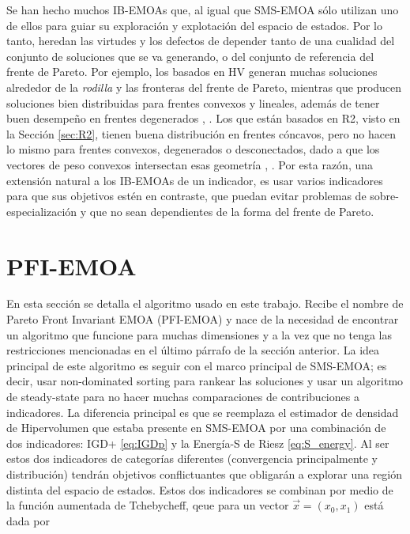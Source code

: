 Se han hecho muchos IB-EMOAs que, al igual que SMS-EMOA sólo utilizan uno de ellos para guiar su exploración y explotación del espacio de estados. Por lo tanto, heredan las virtudes y los defectos de depender tanto de una cualidad del conjunto de soluciones que se va generando, o del conjunto de referencia del frente de Pareto. Por ejemplo, los basados en HV generan muchas soluciones alrededor de la \emph{rodilla} y las fronteras del frente de Pareto, mientras que producen soluciones bien distribuidas para frentes convexos y lineales, además de tener buen desempeño en frentes degenerados \cite{HV_reference}, \cite{SMS-EMOA}. Los que están basados en R2, visto en la Sección \ref{sec:R2}, tienen buena distribución en frentes cóncavos, pero no hacen lo mismo para frentes convexos, degenerados o desconectados, dado a que los vectores de peso convexos intersectan esas geometría \cite{performance_pareto_front}, \cite{R2-EMOA}. Por esta razón, una extensión natural a los IB-EMOAs de un indicador, es usar varios indicadores para que sus objetivos estén en contraste, que puedan evitar problemas de sobre-especialización y que no sean dependientes de la forma del frente de Pareto.  

\section{PFI-EMOA} \label{sec:PFI-EMOA}

En esta sección se detalla el algoritmo usado en este trabajo. Recibe el nombre de Pareto Front Invariant EMOA (PFI-EMOA) y nace de la necesidad de encontrar un algoritmo que funcione para muchas dimensiones y a la vez que no tenga las restricciones mencionadas en el último párrafo de la sección anterior. La idea principal de este algoritmo es seguir con el marco principal de SMS-EMOA; es decir, usar non-dominated sorting para rankear las soluciones y usar un algoritmo de steady-state para no hacer muchas comparaciones de contribuciones a indicadores. La diferencia principal es que se reemplaza el estimador de densidad de Hipervolumen que estaba presente en SMS-EMOA por una combinación de dos indicadores: IGD+ \eqref{eq:IGDp} y la Energía-S de Riesz \eqref{eq:S_energy}. Al ser estos dos indicadores de categorías diferentes (convergencia principalmente y distribución) tendrán objetivos conflictuantes que obligarán a explorar una región distinta del espacio de estados. Estos dos indicadores se combinan por medio de la función aumentada de Tchebycheff,  qeue para un vector $\vec{x}=(x_0,x_1)$ está dada por


